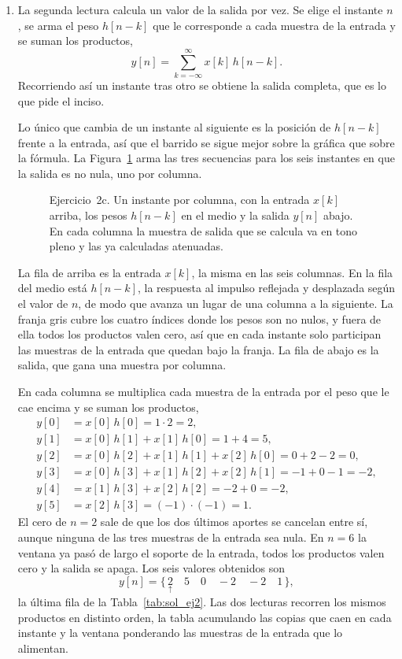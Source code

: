 \documentclass[10pt,a4paper]{article}
\begin{document}
\begin{enumerate}
		\item La segunda lectura calcula un valor
		de la salida por vez. Se elige el instante $n$, se arma el peso $h[n-k]$ que le
		corresponde a cada muestra de la entrada y se suman los productos,
		\[
			y[n] = \sum_{k=-\infty}^{\infty} x[k]\,h[n-k].
		\]
		Recorriendo así un instante tras otro se obtiene la salida completa, que es lo que
		pide el inciso.

		Lo único que cambia de un instante al siguiente es la posición de $h[n-k]$ frente a
		la entrada, así que el barrido se sigue mejor sobre la gráfica que sobre la fórmula.
		La Figura~\ref{fig:sol_ej2c} arma las tres secuencias para los seis instantes en que
		la salida es no nula, uno por columna.

		\begin{figure}[H]
			\centering
			
			\caption{Ejercicio~2c. Un instante por columna, con la entrada $x[k]$ arriba, los
			pesos $h[n-k]$ en el medio y la salida $y[n]$ abajo. En cada columna la muestra
			de salida que se calcula va en tono pleno y las ya calculadas atenuadas.}
			\label{fig:sol_ej2c}
		\end{figure}

		La fila de arriba es la entrada $x[k]$, la misma en las seis columnas. En la fila del
		medio está $h[n-k]$, la respuesta al impulso reflejada y desplazada según el valor de
		$n$, de modo que avanza un lugar de una columna a la siguiente. La franja gris cubre
		los cuatro índices donde los pesos son no nulos, y fuera de ella todos los productos
		valen cero, así que en cada instante solo participan las muestras de la entrada que
		quedan bajo la franja. La fila de abajo es la salida, que gana una muestra por
		columna.

		En cada columna se multiplica cada muestra de la entrada por el peso que le cae
		encima y se suman los productos,
		\begin{align*}
			y[0] &= x[0]\,h[0] = 1\cdot 2 = 2, \\
			y[1] &= x[0]\,h[1] + x[1]\,h[0] = 1 + 4 = 5, \\
			y[2] &= x[0]\,h[2] + x[1]\,h[1] + x[2]\,h[0] = 0 + 2 - 2 = 0, \\
			y[3] &= x[0]\,h[3] + x[1]\,h[2] + x[2]\,h[1] = -1 + 0 - 1 = -2, \\
			y[4] &= x[1]\,h[3] + x[2]\,h[2] = -2 + 0 = -2, \\
			y[5] &= x[2]\,h[3] = (-1)\cdot(-1) = 1.
		\end{align*}
		El cero de $n=2$ sale de que los dos últimos aportes se cancelan entre sí, aunque
		ninguna de las tres muestras de la entrada sea nula. En $n=6$ la ventana ya pasó de
		largo el soporte de la entrada, todos los productos valen cero y la salida se apaga.
		Los seis valores obtenidos son
		\[
			\boxed{\;y[n] = \{\, \underset{\uparrow}{2} \quad 5 \quad 0 \quad -2 \quad -2 \quad 1 \,\},\;}
		\]
		la última fila de la Tabla~\ref{tab:sol_ej2}. Las dos lecturas recorren los mismos
		productos en distinto orden, la tabla acumulando las copias que caen en cada instante
		y la ventana ponderando las muestras de la entrada que lo alimentan.


\end{enumerate}
\end{document}

